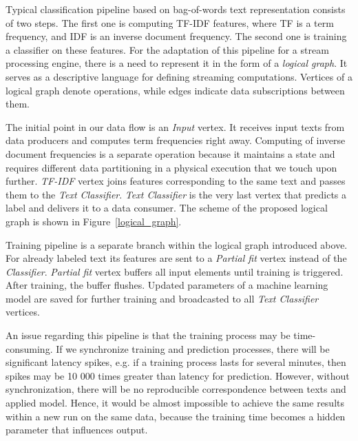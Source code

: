 Typical classification pipeline based on bag-of-words text representation consists of two steps. The first one is computing TF-IDF features, where TF is a term frequency, and IDF is an inverse document frequency. The second one is training a classifier on these features. For the adaptation of this pipeline for a stream processing engine, there is a need to represent it in the form of a {\em logical graph}. It serves as a descriptive language for defining streaming computations. Vertices of a logical graph denote operations, while edges indicate data subscriptions between them. 

The initial point in our data flow is an {\em Input} vertex. It receives input texts from data producers and computes term frequencies right away. Computing of inverse document frequencies is a separate operation because it maintains a state and requires different data partitioning in a physical execution that we touch upon further. {\em TF-IDF} vertex joins features corresponding to the same text and passes them to the {\em Text Classifier}. {\em Text Classifier} is the very last vertex that predicts a label and delivers it to a data consumer. The scheme of the proposed logical graph is shown in Figure~\ref{logical_graph}.

Training pipeline is a separate branch within the logical graph introduced above. For already labeled text its features are sent to a {\em Partial fit} vertex instead of the {\em Classifier}. {\em Partial fit} vertex buffers all input elements until training is triggered. After training, the buffer flushes. Updated parameters of a machine learning model are saved for further training and broadcasted to all {\em Text Classifier} vertices.

An issue regarding this pipeline is that the training process may be time-consuming. If we synchronize training and prediction processes, there will be significant latency spikes, e.g. if a training process lasts for several minutes, then spikes may be 10 000 times greater than latency for prediction. However, without synchronization, there will be no reproducible correspondence between texts and applied model. Hence, it would be almost impossible to achieve the same results within a new run on the same data, because the training time becomes a hidden parameter that influences output.

